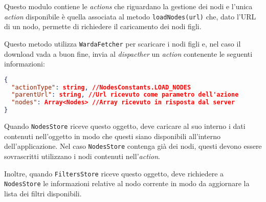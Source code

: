 Questo modulo contiene le \textit{actions} che riguardano la gestione dei nodi e l'unica \textit{action} disponibile è quella associata al metodo \texttt{loadNodes(url)} che, dato l'URL di un nodo, permette di richiedere il caricamento dei nodi figli.

Questo metodo utilizza \texttt{WardaFetcher} per scaricare i nodi figli e, nel caso il download vada a buon fine, invia al \textit{dispacther} un \textit{action} contenente le seguenti informazioni:
\begin{lstlisting}[language=JSON, caption=Action - load nodes]
{
  "actionType": string, //NodesConstants.LOAD_NODES
  "parentUrl": string, //Url ricevuto come parametro dell'azione
  "nodes": Array<Nodes> //Array ricevuto in risposta dal server
}
\end{lstlisting}

Quando \texttt{NodesStore} riceve questo oggetto, deve caricare al suo interno i dati contenuti nell'oggetto in modo che questi siano disponibili all'interno dell'applicazione. Nel caso \texttt{NodesStore} contenga già dei nodi, questi devono essere sovrascritti utilizzano i nodi contenuti nell'\textit{action}.

Inoltre, quando \texttt{FiltersStore} riceve questo oggetto, deve richiedere a \texttt{NodesStore} le informazioni relative al nodo corrente in modo da aggiornare la lista dei filtri disponibili.